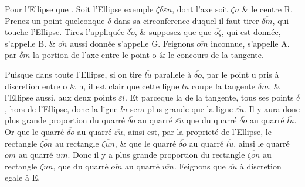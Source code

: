 \documentclass[11pt,a4paper]{article}
\begin{document}
Pour l'Ellipse   \ill{} que . Soit l'Ellipse exemple $\overline{\zeta\delta\varepsilon n}$, dont l'axe soit $\overline{\zeta n}$ \& le centre R. Prenez un point quelconque $\delta$ dans sa circonference duquel il faut tirer $\overline{\delta m}$, qui touche l'Ellipse. Tirez l'appliquée $\overline{\delta o}$, \& supposez  que  \ill{} que $\overline{o\zeta}$, qui est donnée, s'appelle B. \& $\overline{on}$ aussi donnée s'appelle G. Feignons  $\overline{om}$ inconnue, s'appelle A.   par $\overline{\delta m}$ la portion de l'axe  entre le point o \& le concours de la tangente.

Puisque dans toute l'Ellipse, si on tire $\overline{lu}$ parallele à $\overline{\delta o}$, par le point u pris à discretion entre o \& n, il est clair que cette ligne $\overline{lu}$ coupe la tangente $\overline{\delta m}$, \& l'Ellipse aussi, aux deux points $\overline{\varepsilon l}$. Et parceque la  de la tangente, tous ses points  $\delta$,  hors de l'Ellipse, donc la ligne $\overline{lu}$ sera plus grande que la ligne $\overline{\varepsilon u}$. Il y aura donc plus grande proportion du quarré $\overline{\delta o}$ au quarré $\overline{\varepsilon u}$ que du quarré $\overline{\delta o}$ au quarré $\overline{lu}$. Or que le quarré $\overline{\delta o}$ au quarré $\overline{\varepsilon u}$, ainsi est, par la proprieté de l'Ellipse, le rectangle $\overline{\zeta on}$ au rectangle $\overline{\zeta un}$, \& que le quarré $\overline{\delta o}$ au quarré \struck{\ill{}} $\overline{lu}$, ainsi le quarré $\overline{om}$ au quarré $\overline{um}$. Donc il y a plus grande proportion du rectangle $\overline{\zeta on}$ au rectangle $\overline{\zeta un}$, que du quarré $\overline{om}$ au quarré $\overline{um}$. Feignons que $\overline{ou}$  à discretion  egale à E.
\end{document}
